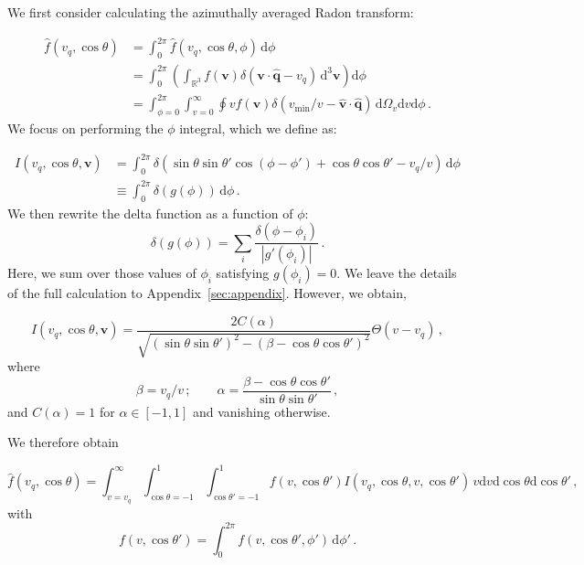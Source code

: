 We first consider calculating the azimuthally averaged Radon transform:

\begin{align}
\hat{f}(v_q, \cos\theta) &= \int_0^{2\pi} \hat{f}(v_q, \cos\theta, \phi) \, \mathrm{d}\phi \\
&= \int_0^{2\pi}\left( \int_{\mathbb{R}^3} f(\mathbf{v}) \delta\left(\mathbf{v}\cdot\hat{\mathbf{q}} - v_q \right)\, \mathrm{d}^3\mathbf{v} \right) \mathrm{d}\phi \\
&= \int_{\phi = 0}^{2\pi} \int_{v = 0}^{\infty} \oint v f(\textbf{v}) \delta\left(v_\textrm{min}/v - \hat{\textbf{v}}\cdot\hat{\textbf{q}}\right) \, \mathrm{d}\Omega_v \mathrm{d}v \mathrm{d}\phi\,.
\end{align}
We focus on performing the $\phi$ integral, which we define as:

\begin{align}
I(v_q, \cos\theta, \mathbf{v}) &= \int_{0}^{2\pi} \delta\left(\sin\theta\sin\theta' \cos(\phi-\phi') + \cos\theta\cos\theta' - v_q/v\right) \label{eq:defI} \, \mathrm{d}\phi \\
&\equiv \int_{0}^{2\pi} \delta\left(g(\phi)\right) \, \mathrm{d}\phi\,.
\end{align}
We then rewrite the delta function as a function of $\phi$:
\begin{equation}
\label{eq:deltadecomp}
\delta\left(g(\phi)\right) = \sum_{i} \frac{\delta(\phi - \phi_i)}{|g'(\phi_i)|}\,.
\end{equation}
Here, we sum over those values of $\phi_i$ satisfying $g(\phi_i) = 0$. We leave the details of the full calculation to Appendix~\ref{sec:appendix}. However, we obtain,

\begin{equation}
I(v_q, \cos\theta, \mathbf{v}) = \frac{2 C(\alpha)}{\sqrt{\left(\sin\theta\sin\theta'\right)^2 - \left(\beta - \cos\theta\cos\theta'\right)^2}}\Theta(v - v_q)\,,
\end{equation}
where
\begin{equation}
\beta = v_q/v\,; \qquad \alpha = \frac{\beta - \cos\theta\cos\theta'}{\sin\theta \sin\theta'}\,,
\end{equation}
and $C(\alpha) = 1$ for $\alpha \in [-1,1]$ and vanishing otherwise.

We therefore obtain

\begin{equation}
\hat{f}(v_q, \cos\theta) = \int_{v=v_q}^{\infty} \int_{\cos\theta=-1}^{1} \int_{\cos\theta'=-1}^{1} f(v, \cos\theta') I(v_q, \cos\theta, v, \cos\theta')\, v \mathrm{d}v \mathrm{d}\cos\theta \mathrm{d}\cos\theta'\,,
\end{equation}
with
\begin{equation}
f(v, \cos\theta') = \int_{0}^{2\pi} f(v, \cos\theta', \phi') \, \mathrm{d}\phi'\,.
\end{equation}

